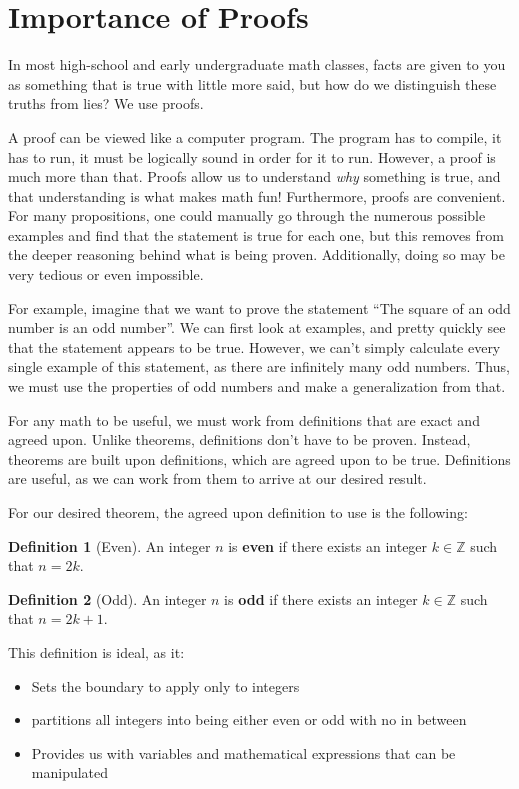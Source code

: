 \documentclass{article}
\theoremstyle{definition}
\newtheorem{definition}{Definition}[]
\theoremstyle{plain}
\theoremstyle{activity}
\begin{document}
\section{Importance of Proofs}

In most high-school and early undergraduate math classes, facts are given to you as something that is true with little more said, but how do we distinguish these truths from lies? We use proofs.

A proof can be viewed like a computer program. The program has to compile, it has to run, it must be logically sound in order for it to run.     However, a proof is much more than that. Proofs allow us to understand \emph{why} something is true, and that understanding is what makes math fun! Furthermore, proofs are convenient. For many propositions, one could manually go through the numerous possible examples and find that the statement is true for each one, but this removes from the deeper reasoning behind what is being proven. Additionally, doing so may be very tedious or even impossible.

For example, imagine that we want to prove the statement ``The square of an odd number is an odd number''. We can first look at examples, and pretty quickly see that the statement appears to be true. However, we can't simply calculate every single example of this statement, as there are infinitely many odd numbers. Thus, we must use the properties of odd numbers and make a generalization from that.

For any math to be useful, we must work from definitions that are exact and agreed upon. Unlike theorems, definitions don't have to be proven. Instead, theorems are built upon definitions, which are agreed upon to be true. Definitions are useful, as we can work from them to arrive at our desired result.

For our desired theorem, the agreed upon definition to use is the following:

\begin{definition}[Even]
    An integer \(n\) is \textbf{even} if there exists an integer \(k \in \mathbb{Z}\) such that \(n = 2k\).
\end{definition}

\begin{definition}[Odd]
    An integer \(n\) is \textbf{odd} if there exists an integer \(k \in \mathbb{Z}\) such that \(n = 2k + 1\).
\end{definition}

This definition is ideal, as it:
  \begin{itemize}
    \item Sets the boundary to apply only to integers
    \item partitions all integers into being either even or odd with no in between
    \item Provides us with variables and mathematical expressions that can be manipulated
  \end{itemize}
\end{document}

